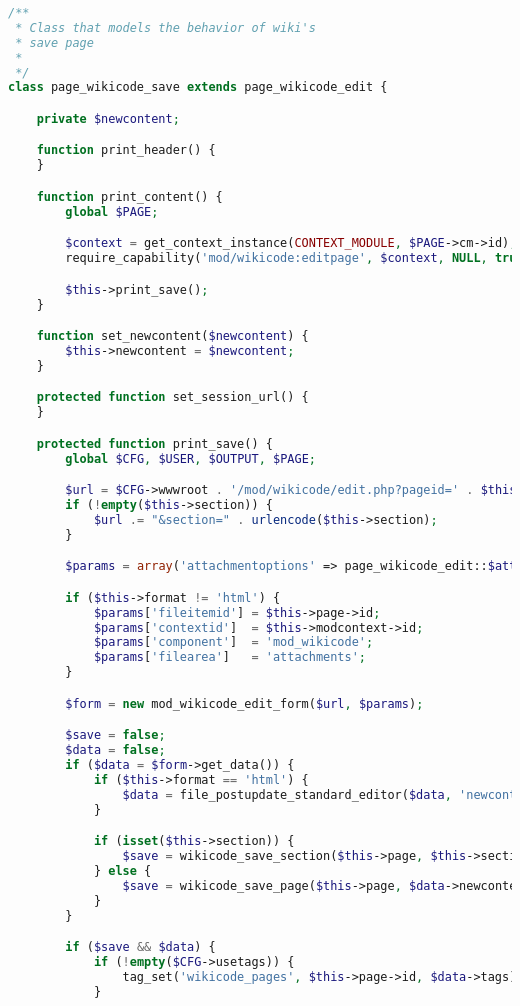 \begin{lstlisting}[language=PHP]
/**
 * Class that models the behavior of wiki's
 * save page
 *
 */
class page_wikicode_save extends page_wikicode_edit {

    private $newcontent;

    function print_header() {
    }

    function print_content() {
        global $PAGE;

        $context = get_context_instance(CONTEXT_MODULE, $PAGE->cm->id);
        require_capability('mod/wikicode:editpage', $context, NULL, true, 'noeditpermission', 'wikicode');

        $this->print_save();
    }

    function set_newcontent($newcontent) {
        $this->newcontent = $newcontent;
    }

    protected function set_session_url() {
    }

    protected function print_save() {
        global $CFG, $USER, $OUTPUT, $PAGE;

        $url = $CFG->wwwroot . '/mod/wikicode/edit.php?pageid=' . $this->page->id;
        if (!empty($this->section)) {
            $url .= "&section=" . urlencode($this->section);
        }

        $params = array('attachmentoptions' => page_wikicode_edit::$attachmentoptions, 'format' => $this->format, 'version' => $this->versionnumber);

        if ($this->format != 'html') {
            $params['fileitemid'] = $this->page->id;
            $params['contextid']  = $this->modcontext->id;
            $params['component']  = 'mod_wikicode';
            $params['filearea']   = 'attachments';
        }

        $form = new mod_wikicode_edit_form($url, $params);

        $save = false;
        $data = false;
        if ($data = $form->get_data()) {
            if ($this->format == 'html') {
                $data = file_postupdate_standard_editor($data, 'newcontent', page_wikicode_edit::$attachmentoptions, $this->modcontext, 'mod_wikicode', 'attachments', $this->subwiki->id);
            }

            if (isset($this->section)) {
                $save = wikicode_save_section($this->page, $this->section, $data->newcontent, $USER->id);
            } else {
                $save = wikicode_save_page($this->page, $data->newcontent, $USER->id);
            }
        }

        if ($save && $data) {
            if (!empty($CFG->usetags)) {
                tag_set('wikicode_pages', $this->page->id, $data->tags);
            }


\end{lstlisting}
